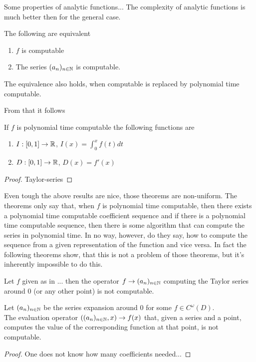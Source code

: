 		Some properties of analytic functions...
		The complexity of analytic functions is much better then for the general case.
		\begin{theorem} 
			The following are equivalent
			\begin{enumerate}
				\item $f$ is computable 
				\item The series $(a_n)_{n \in \mathbb N}$ is computable. 
 			\end{enumerate}
 			The equivalence also holds, when computable is replaced by polynomial time computable.
		\end{theorem}
		From that it follows
		\begin{corollary}
			If $f$ is polynomial time computable the following functions are
			\begin{enumerate}
				\item $I: [0,1] \to \mathbb R$, $I(x) = \int_0^x f(t) dt$
				\item $D: [0,1] \to \mathbb R$, $D(x) = f'(x)$ 
			\end{enumerate}
			\begin{proof}
				Taylor-series
			\end{proof}
		\end{corollary}
		Even tough the above results are nice, those theorems are non-uniform.
		The theorems only say that, when $f$ is polynomial time computable, then there exists 
		a polynomial time computable coefficient sequence and if there is a polynomial time computable sequence, then
		there is some algorithm that can compute the series in polynomial time.
		In no way, however, do they say, how to compute the sequence from a given representation of the function and vice versa.
		In fact the following theorems show, that this is not a problem of those theorems, but it's inherently impossible to do this.
		\begin{theorem}
			Let $f$ given as in ... then the operator $f \to (a_n)_{n \in \mathbb N}$ computing the Taylor series around $0$ (or any other point) is not computable.
		\end{theorem} 
		\begin{theorem}
			Let $(a_n)_{n \in \mathbb N}$ be the series expansion around $0$ for some $f \in C^\omega(D)$.\\
			The evaluation operator $((a_n)_{n \in \mathbb N}, x) \to f(x)$ that, given a series and a point, computes the value of the corresponding function at that point, is not computable.
			\begin{proof}
				One does not know how many coefficients needed...
			\end{proof}
		\end{theorem} 

